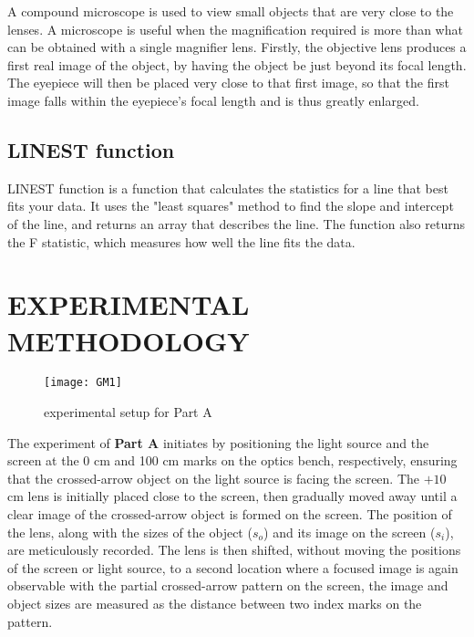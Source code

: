 \documentclass[a4paper,11pt]{article}
\begin{document}
A compound microscope is used to view small objects that are very close to the lenses. A microscope is useful when the magnification required is more than what can be obtained with a single magnifier lens. Firstly, the objective lens produces a first real image of the object, by having the object be just beyond its focal length. The eyepiece will then be placed very close to that first image, so that the first image falls within the eyepiece's focal length and is thus greatly enlarged.

\subsection*{LINEST function}
LINEST function is a function that calculates the statistics for a line that best fits your data. It uses the "least squares" method to find the slope and intercept of the line, and returns an array that describes the line. The function also returns the F statistic, which measures how well the line fits the data.\\
\newpage
{}
\section*{\center EXPERIMENTAL METHODOLOGY}
\label{sec:EXPERIMENTAL METHODOLOGY}
\begin{figure}[htbp]
\centering
\texttt{[image: GM1]}
\caption{experimental setup for Part A}
\label{6}
\end{figure}
The experiment of \textbf{Part A} initiates by positioning the light source and the screen at the 0 cm and 100 cm marks on the optics bench, respectively, ensuring that the crossed-arrow object on the light source is facing the screen. The $+10$ cm lens is initially placed close to the screen, then gradually moved away until a clear image of the crossed-arrow object is formed on the screen. The position of the lens, along with the sizes of the object ($s_o$) and its image on the screen ($s_i$), are meticulously recorded. The lens is then shifted, without moving the positions of the screen or light source, to a second location where a focused image is again observable with the partial crossed-arrow pattern on the screen, the image and object sizes are measured as the distance between two index marks on the pattern.\\
\end{document}
